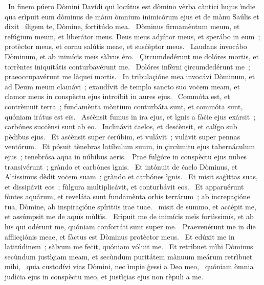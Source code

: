 {~In finem púero Dòmini Davídi qui locútus est dòmino vèrba càntici hujus ìndie qua erìpuit eum dòminus de mànu òmnium inimicórum ejus et de mànu Saúlis et dixit}
{%
~íligem te, Dòmine, fortitúdo mea. 
~Dòminus firmamèntum meum, et refúġium meum, et liberátor meus. Deus meus adjútor meus, et sperábo in eum~; protèctor meus, et cornu salútis meae, et susċèptor meus. 
~Laudans invocábo Dòminum, et ab inimícïs meïs sàlvus èro. 
~Çircumdedérunt me dolóres mortis, et torrèntes iniquitátis conturbavérunt me. 
~Dolóres infèrni çircumdedérunt me~; praeoccupavérunt me làquei mortis. 
~In tribulaçióne mea invocávi Dòminum, et ad Deum meum clamávi~; exaudívit de templo sancto suo voċem meam, et clamor meus in conspèctu ejus introíbit in aures ejus. 
~Commóta est, et contrèmuit terra~; fundamènta mòntium conturbáta sunt, et commóta sunt, quóniam irátus est eïs. 
~Asċènsit fumus in ira ejus, et ìgnis a fàċie ejus exársit~; carbónes sucċènsi sunt ab eo. 
~Inclinávit ċaelos, et desċènsit, et calígo sub pèdibus ejus. 
~Et asċènsit super ċerúbim, et vulávit~; vulávit super pennas ventórum. 
~Et pósuit tènebras latíbulum suum, in çircùmitu ejus tabernáculum ejus~; tenebrósa aqua in núbibus aeris. 
~Prae fulġóre in conspèctu ejus nubes transivérunt~; gràndo et carbónes ìgnis. 
~Et intónuit de ċaelo Dòminus, et Altìssimus dèdit voċem suam~; gràndo et carbónes ìgnis. 
~Et misit saġìttas suas, et dissipávit eos~; fùlgura multiplicávit, et conturbávit eos. 
~Et apparuérunt fòntes aquárum, et reveláta sunt fundamènta orbis terrárum~; ab increpaçióne tua, Dòmine, ab inspiraçióne spíritüs irae tuae. 
~misit de summo, et acċépit me, et assúmpsit me de aquïs mùltïs. 
~Erìpuit me de inimícïs meïs fortìssimïs, et ab hïs qui odérunt me, quóniam confortáti sunt super me. 
~Praevenérunt me in die afflicçiónis meae, et fàctus est Dòminus protèctor meus. 
~Et edúxit me in latitúdinem~; sàlvum me feċit, quóniam vóluit me. 
~Et retrìbuet mìhi Dòminus secùndum justìçiam meam, et secùndum puritátem mànuum meárum retrìbuet mìhi, 
~quia custodívi vias Dòmini, nec ìmpie ġessi a Deo meo, 
~quóniam òmnia judìċia ejus in conspèctu meo, et justìçias ejus non rèpuli a me. 
}
